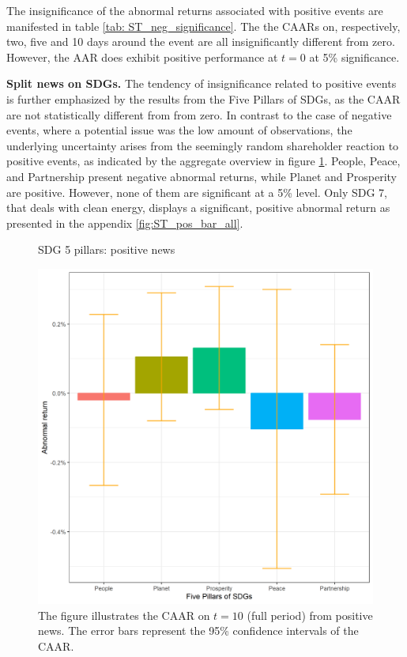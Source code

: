 The insignificance of the abnormal returns associated with positive events are manifested in table \ref{tab: ST_neg_significance}. The the CAARs on, respectively, two, five and 10 days around the event are all insignificantly different from zero. However, the AAR does exhibit positive performance at $t = 0$ at 5\% significance.


\textbf{Split news on SDGs.}
The tendency of insignificance related to positive events is further emphasized by the results from the Five Pillars of SDGs, as the CAAR are not statistically different from from zero. In contrast to the case of negative events, where a potential issue was the low amount of observations, the underlying uncertainty arises from the seemingly random shareholder reaction to positive events, as indicated by the aggregate overview in figure \ref{fig:ST_pos_bar}. People, Peace, and Partnership present negative abnormal returns, while Planet and Prosperity are positive. However, none of them are significant at a 5\% level. Only SDG 7, that deals with clean energy, displays a significant, positive abnormal return as presented in the appendix \ref{fig:ST_pos_bar_all}. 

\begin{figure} [H]
    \centering
    \caption{SDG 5 pillars: positive news}
    \includegraphics[scale=0.6]{Projekt/1.Figures analysis/ST_positive_sdg_bar_groups_0.png}
    \caption*{\footnotesize The figure illustrates the CAAR on $t = 10$ (full period) from positive news. The error bars represent the 95\% confidence intervals of the CAAR.}
    \label{fig:ST_pos_bar}
\end{figure}


